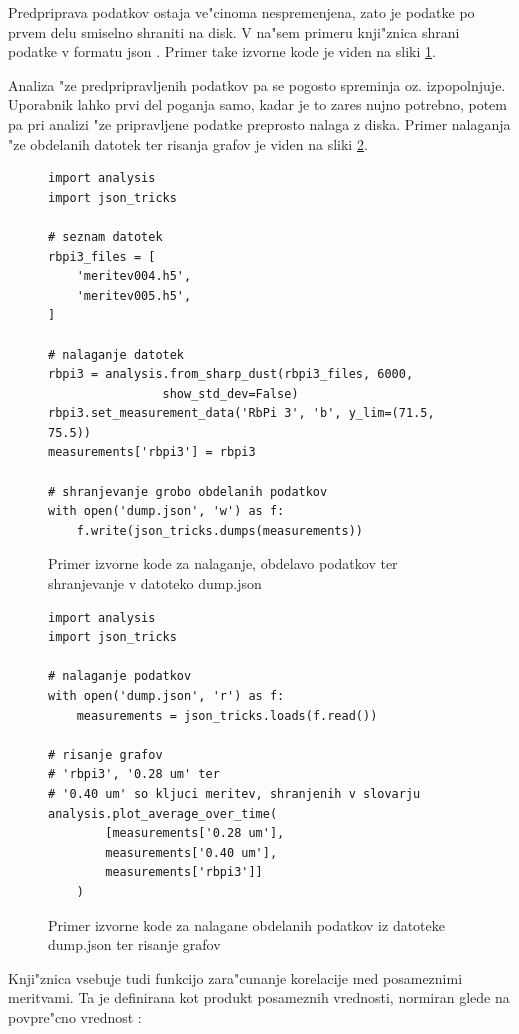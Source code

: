 \documentclass[12pt,a4paper]{article}
\begin{document}
Predpriprava podatkov ostaja ve"cinoma nespremenjena, zato je podatke po prvem delu smiselno shraniti na disk. V na"sem primeru knji"znica shrani podatke v formatu json \cite{json}. Primer take izvorne kode je viden na sliki \ref{dump-data}.

Analiza "ze predpripravljenih podatkov pa se pogosto spreminja oz. izpopolnjuje. Uporabnik lahko prvi del poganja samo, kadar je to zares nujno potrebno, potem pa pri analizi "ze pripravljene podatke preprosto nalaga z diska. Primer nalaganja "ze obdelanih datotek ter risanja grafov je viden na sliki \ref{plot-data}.

\begin{figure}[H]
	\begin{lstlisting}[frame=single]
import analysis
import json_tricks

# seznam datotek
rbpi3_files = [
	'meritev004.h5',
	'meritev005.h5',
]

# nalaganje datotek
rbpi3 = analysis.from_sharp_dust(rbpi3_files, 6000,
				show_std_dev=False)
rbpi3.set_measurement_data('RbPi 3', 'b', y_lim=(71.5, 75.5))
measurements['rbpi3'] = rbpi3

# shranjevanje grobo obdelanih podatkov
with open('dump.json', 'w') as f:
	f.write(json_tricks.dumps(measurements))
	\end{lstlisting}
	\caption{Primer izvorne kode za nalaganje, obdelavo podatkov ter shranjevanje v datoteko dump.json}
	\label{dump-data}
\end{figure}

\begin{figure}[H]
	\begin{lstlisting}[frame=single]
import analysis
import json_tricks

# nalaganje podatkov
with open('dump.json', 'r') as f:
	measurements = json_tricks.loads(f.read())

# risanje grafov
# 'rbpi3', '0.28 um' ter
# '0.40 um' so kljuci meritev, shranjenih v slovarju
analysis.plot_average_over_time(
		[measurements['0.28 um'],
		measurements['0.40 um'],
		measurements['rbpi3']]
	)

	\end{lstlisting}
	\caption{Primer izvorne kode za nalagane obdelanih podatkov iz datoteke dump.json ter risanje grafov}
	\label{plot-data}
\end{figure}

Knji"znica vsebuje tudi funkcijo zara"cunanje korelacije med posameznimi meritvami. Ta je definirana kot produkt posameznih vrednosti, normiran glede na povpre"cno vrednost \cite{correlation}:
\end{document}
